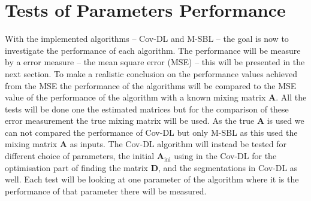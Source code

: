 \section{Tests of Parameters Performance}
With the implemented algorithms -- Cov-DL and M-SBL -- the goal is now to investigate the performance of each algorithm. The performance will be measure by a error measure -- the mean square error (MSE) -- this will be presented in the next section. To make a realistic conclusion on the performance values achieved from the MSE the performance of the algorithms will be compared to the MSE value of the performance of the algorithm with a known mixing matrix $\mathbf{A}$. All the tests will be done one the estimated matrices but for the comparison of these error measurement the true mixing matrix will be used. As the true $\mathbf{A}$ is used we can not compared the performance of Cov-DL but only M-SBL as this used the mixing matrix $\mathbf{A}$ as inputs. The Cov-DL algorithm will instead be tested for different choice of parameters, the initial $\mathbf{A}_{\text{ini}}$ using in the Cov-DL for the optimisation part of finding the matrix $\mathbf{D}$, and the segmentations in Cov-DL as well.
Each test will be looking at one parameter of the algorithm where it is the performance of that parameter there will be measured.

